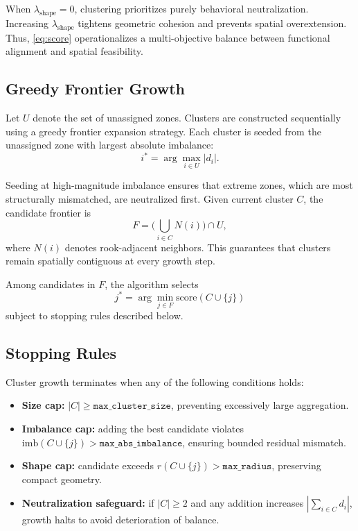 \documentclass[conference]{IEEEtran}
\begin{document}
When $\lambda_{\mathrm{shape}}=0$, clustering prioritizes purely
behavioral neutralization. Increasing $\lambda_{\mathrm{shape}}$
tightens geometric cohesion and prevents spatial overextension.
Thus, \eqref{eq:score} operationalizes a multi-objective balance
between functional alignment and spatial feasibility.

\subsection{Greedy Frontier Growth}

Let $U$ denote the set of unassigned zones. Clusters are constructed
sequentially using a greedy frontier expansion strategy.
Each cluster is seeded from the unassigned zone with largest
absolute imbalance:
\[
i^*=\arg\max_{i\in U}|d_i|.
\]

Seeding at high-magnitude imbalance ensures that extreme zones,
which are most structurally mismatched, are neutralized first.
Given current cluster $C$, the candidate frontier is
\begin{equation}
F =
\Big(
\bigcup_{i\in C} N(i)
\Big)\cap U,
\end{equation}
where $N(i)$ denotes rook-adjacent neighbors. This guarantees that
clusters remain spatially contiguous at every growth step.

Among candidates in $F$, the algorithm selects
\[
j^*=\arg\min_{j\in F}
\mathrm{score}(C\cup\{j\})
\]
subject to stopping rules described below.

\subsection{Stopping Rules}

Cluster growth terminates when any of the following conditions holds:

\begin{itemize}
  \item \textbf{Size cap:} $|C|\geq \texttt{max\_cluster\_size}$,
        preventing excessively large aggregation.
  \item \textbf{Imbalance cap:} adding the best candidate violates
        $\mathrm{imb}(C\cup\{j\})>
        \texttt{max\_abs\_imbalance}$,
        ensuring bounded residual mismatch.
  \item \textbf{Shape cap:} candidate exceeds
        $r(C\cup\{j\})>
        \texttt{max\_radius}$,
        preserving compact geometry.
  \item \textbf{Neutralization safeguard:}
        if $|C|\ge 2$ and any addition increases
        $\left|\sum_{i\in C} d_i\right|$,
        growth halts to avoid deterioration of balance.
\end{itemize}
\end{document}
